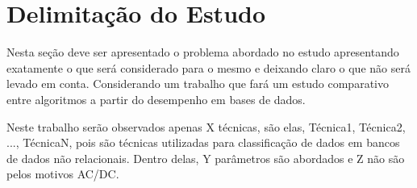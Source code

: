 

\section{Delimitação do Estudo}
    \label{sec:delimitacao-estudo}
    
    Nesta seção deve ser apresentado o problema abordado no estudo apresentando exatamente o que será considerado para o mesmo e deixando claro o que não será levado em conta. Considerando um trabalho que fará um estudo comparativo entre algoritmos a partir do desempenho em bases de dados.
    
    Neste trabalho serão observados apenas X técnicas, são elas, Técnica1, Técnica2, ..., TécnicaN, pois são técnicas utilizadas para classificação de dados em bancos de dados não relacionais. Dentro delas, Y parâmetros são abordados e Z não são pelos motivos AC/DC.
    
    
    
    